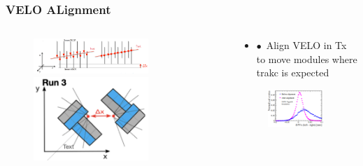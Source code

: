 \documentclass[aspectratio=1610, 12pt, xcolor=dvipsnames]{beamer}
\begin{document}
\begin{frame}\frametitle{VELO ALignment}
  \begin{columns}
    \begin{column}[c]{0.5\textwidth}
      \begin{figure}
        \includegraphics[width=0.7\textwidth]{plots/velo_tracks_before_after.png}
        \includegraphics[width=0.7\textwidth]{plots/velo_deltax.png}
      \end{figure}
    \end{column}
    \begin{column}{0.5\textwidth}
      \begin{itemize}
        \item $\bullet$\, Align VELO in Tx to move modules where trakc is expected
      \end{itemize}
      \begin{figure}
        \centering
        \includegraphics[width=0.9\textwidth]{plots/PVx_velo.png}
      \end{figure}
    \end{column}
  \end{columns}
\end{frame}
\end{document}
